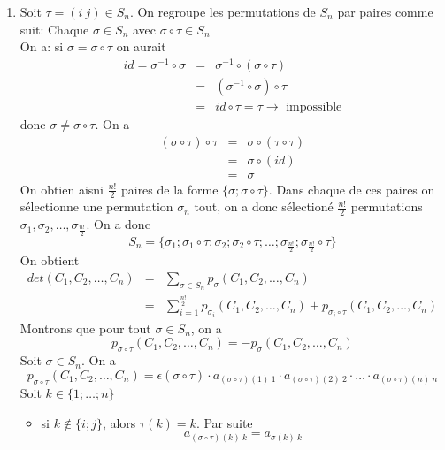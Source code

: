 {\begin{enumerate}
    \item Soit $\tau = (i ~ j) \in S_n$. On regroupe les permutations de $S_n$ par paires comme suit: Chaque $\sigma \in S_n$ avec $\sigma \circ \tau \in S_n$ \\
      On a: si $\sigma = \sigma \circ \tau$ on aurait
      \begin{eqnarray*}
        id = \sigma^{-1} \circ \sigma &=& \sigma^{-1} \circ (\sigma \circ \tau) \\
          &=& (\sigma^{-1} \circ \sigma) \circ \tau \\
          &=& id \circ \tau = \tau \rightarrow\text{ impossible}
      \end{eqnarray*}
      donc $\sigma \neq \sigma \circ \tau$. On a
      \begin{eqnarray*}
        (\sigma \circ \tau) \circ \tau &=& \sigma \circ (\tau \circ \tau) \\
          &=& \sigma \circ (id) \\
          &=& \sigma 
      \end{eqnarray*}
      On obtien aisni $\frac{n!}{2}$ paires de la forme $\{\sigma; \sigma  \circ \tau\}$. Dans chaque de ces paires on sélectionne une permutation $\sigma_n$ tout, on a donc sélectioné $\frac{n!}{2}$ permutations $\sigma_1, \sigma_2, \ldots, \sigma_{\frac{n!}{2}}$. On a donc
      $$S_n = \{ \sigma_1; \sigma_1 \circ \tau; \sigma_2; \sigma_2 \circ \tau; \ldots; \sigma_{\frac{n!}{2}}; \sigma_{\frac{n!}{2}} \circ \tau \}$$
      On obtient 
      \begin{eqnarray*}
        det(C_1, C_2, \ldots, C_n) &=& \sum_{\sigma \in S_n} p_{\sigma}(C_1, C_2, \ldots, C_n) \\
         &=& \sum_{i=1}^{\frac{n!}{2}} p_{\sigma_i}(C_1, C_2, \ldots, C_n) + p_{\sigma_i \circ \tau}(C_1, C_2, \ldots, C_n)
      \end{eqnarray*}
      Montrons que pour tout $\sigma \in S_n$, on a
      $$p_{\sigma \circ \tau}(C_1, C_2, \ldots, C_n) = -p_{\sigma}(C_1, C_2, \ldots, C_n)$$
      Soit $\sigma \in S_n$. On a 
      $$p_{\sigma \circ \tau}(C_1, C_2, \ldots, C_n) = \epsilon(\sigma \circ \tau) \cdot a_{(\sigma \circ\tau)(1) ~ 1} \cdot a_{(\sigma \circ\tau)(2) ~ 2} \cdot \ldots \cdot a_{(\sigma \circ\tau)(n) ~ n}$$
      Soit $k \in \{1; \ldots; n\}$
      \begin{itemize}
        \item si $k\notin \{i; j\}$, alors $\tau(k) = k$. Par suite 
          $$a_{(\sigma \circ \tau)(k) ~ k} = a_{\sigma(k) ~ k}$$
        

\end{itemize}
\end{enumerate}}
